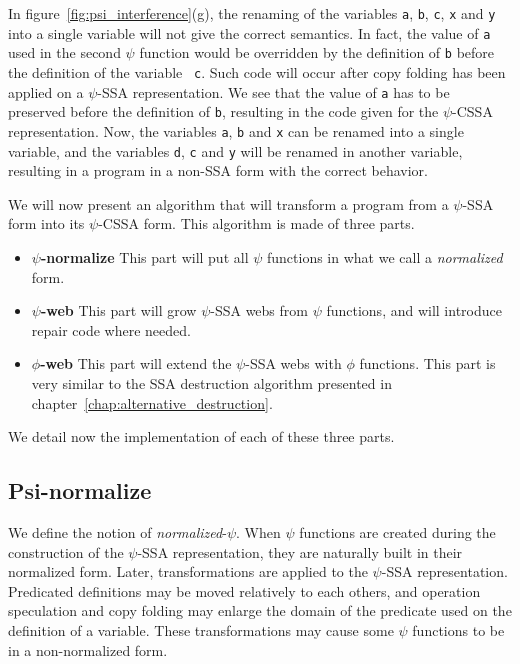 In figure~\ref{fig:psi_interference}(g), the renaming of the variables
{\tt a}, {\tt b}, {\tt c}, {\tt x} and {\tt y} into a single variable
will not give the correct semantics. In fact, the value of {\tt a}
used in the second $\psi$ function would be overridden by the
definition of {\tt b} before the definition of the variable {\tt
  c}. Such code will occur after copy folding has been applied on a
$\psi$-SSA representation. We see that the value of {\tt a} has to be
preserved before the definition of {\tt b}, resulting in the code
given for the $\psi$-CSSA representation. Now, the variables {\tt a},
{\tt b} and {\tt x} can be renamed into a single variable, and the
variables {\tt d}, {\tt c} and {\tt y} will be renamed in another
variable, resulting in a program in a non-SSA form with the correct
behavior.

We will now present an algorithm that will transform a program from a
$\psi$-SSA form into its $\psi$-CSSA form. This algorithm is made of
three parts.

\begin{itemize}
\item {\bf $\psi$-normalize} This part will put all $\psi$ functions
in what we call a {\em normalized} form.
\item {\bf $\psi$-web} This part will grow $\psi$-SSA webs from $\psi$
  functions, and will introduce repair code where needed.
\item {\bf $\phi$-web} This part will extend the $\psi$-SSA webs with
  $\phi$ functions. This part is very similar to the SSA destruction
  algorithm presented in chapter~\ref{chap:alternative_destruction}.
\end{itemize}

We detail now the implementation of each of these three parts.

\subsection{Psi-normalize}

We define the notion of {\em normalized}-$\psi$. When $\psi$ functions
are created during the construction of the $\psi$-SSA representation,
they are naturally built in their normalized form. Later,
transformations are applied to the $\psi$-SSA representation.
Predicated definitions may be moved relatively to each others, and
operation speculation and copy folding may enlarge the domain of the
predicate used on the definition of a variable. These transformations
may cause some $\psi$ functions to be in a non-normalized form.

